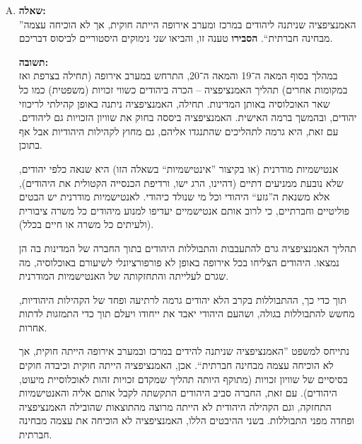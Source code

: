 \documentclass[a4paper]{article}
\newcommand\hl[1]   {#1}
\begin{document}
\begin{enumerate}[A.]
			בשלב הבא, אחרי שהתנועה הלאומית התבססה דיה, לרוב התנועה הלאומית יצאה ל\hl{פעילות פוליטית}, ולפיכך נשאו ונתנו עם השליטים המקומיים במטרה להקים מדינת לאום (בין אם באמצעות פירוק מעצמות והחלפתם במדינות לאום, ובין אם החלפת השלטון בשלטון לאומי). הפעילות הפוליטית התבטאה לעיתים בהפגנות ונסיונות הפיכה, ובעיתות אחרות באמצעות גיוס שליטים בעלי עוצמה צבאית ומדינית שתמכו ברעיון הלאומיות או שהתאים להם לתמוך ברעיון הלאומיות. 
			
			השלב הראשון, בו המשכילים ממציאים וחוקרים את ההיסטוריה של הלאום, הוא הכרחי ליצירת התודעה הלאומית. התודעה הלאומית שמתבססת לרוב על היסטוריה ותרבות משותפת, מתפתחת ומופצת בשלב זה. 
			
			\item \textbf{שאלה: }\\
			''האמנציפציה שניתנה ליהודים במרכז ומערב אירופה הייתה חוקית, אך לא הוכיחה עצמה מבחינה חברתית``. \textbf{הסבירו} טענה זו, והביאו \textit{שני} נימוקים היסטוריים לביסוס דבריכם. 
			
			\textbf{תשובה: }\\
			במהלך בסוף המאה ה־19 והמאה ה־20, התרחש במערב אירופה (תחילה בצרפת ואז במקומות אחרים) תהליך ה\hl{אמנציפציה} – הכרה ביהודים כשווי זכויות (משפטית) כמו כל שאר האוכלוסיה באותן המדינות. תחילה, האמנציפציה ניתנה באופן קהילתי לריכוזי יהודים, ובהמשך ברמה האישית. האמנציפציה ביססה בחוק את שוויון הזכויות גם ליהודים. עם זאת, היא גרמה לתהליכים שהתנגדו אליהם, גם מחוץ לקהילות היהודיות אבל אף בתוכן. 
			
			\hl{אנטישמיות מודרנית} (או בקיצור ''אינטישמיות`` בשאלה הזו) היא שנאה כלפי יהודים, שלא נובעת ממניעים דתיים (דהיינו, הרג ישו, ורדיפת הכנסייה הקטולית את היהודים), אלא משנאת ה''גזע`` היהודי וכל מי שנולד כיהודי. לאנטישמיות מודרנית יש הבטים פוליטיים וחברתיים, כי לרוב אותם אנטישמיים יעדיפו למנוע מיהודים כל משרה ציבורית (ולעיתים כל משרה או חיים בכלל). 
			
			תהליך האמנציפציה גרם \hl{להתעבבות והתבוללות} היהודים בתוך החברה של המדינות בה הן נמצאו. היהודים הצליחו בכל אירופה באופן לא פורפורציונלי לשיעורם באוכלוסיה, מה שגרם לעלייתה והתחזקותה של האנטישמיות המודרנית. 
			
			תוך כדי כך, ההתבוללות בקרב הלא יהודים גרמה לרתיעה ופחד של הקהילות היהודיות, מחשש להתבוללות בגולה, ושהעם היהודי יאבד את ייחודו ויעלם תוך כדי התמזגות לדתות אחרות. 
			
			נתייחס למשפט ''האמנציפציה שניתנה להידים במרכז ובמערב אירופה הייתה חוקית, אך לא הוכיחה עצמה מבחינה חברתית``. אכן, האמנציפציה הייתה חוקית וכיבדה חוקים בסיסיים של שוויון זכויות (מתוקף היותה תהליך שמקדם זכויות זהות לאוכלוסיית מיעוט, היהודים). עם זאת, החברה סביב היהודים התקשתה לקבל אותם אליה והאנטישמיות התחזקה, וגם הקהילה היהודית לא הייתה מרוצה מהתוצאות שהובילה האמנציפציה ופחדה מפני התבוללות. בשני ההיבטים הללו, האמנציפציה לא הוכיחה את עצמה מבחינה חברתית. 
			
		\end{enumerate}
\end{document}
